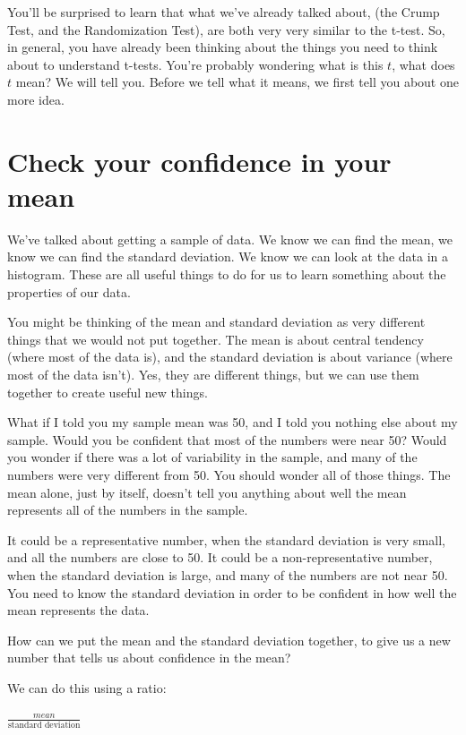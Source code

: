 \documentclass[
]{book}
\begin{document}
You'll be surprised to learn that what we've already talked about, (the Crump Test, and the Randomization Test), are both very very similar to the t-test. So, in general, you have already been thinking about the things you need to think about to understand t-tests. You're probably wondering what is this \(t\), what does \(t\) mean? We will tell you. Before we tell what it means, we first tell you about one more idea.

\section{Check your confidence in your mean}\label{check-your-confidence-in-your-mean}

We've talked about getting a sample of data. We know we can find the mean, we know we can find the standard deviation. We know we can look at the data in a histogram. These are all useful things to do for us to learn something about the properties of our data.

You might be thinking of the mean and standard deviation as very different things that we would not put together. The mean is about central tendency (where most of the data is), and the standard deviation is about variance (where most of the data isn't). Yes, they are different things, but we can use them together to create useful new things.

What if I told you my sample mean was 50, and I told you nothing else about my sample. Would you be confident that most of the numbers were near 50? Would you wonder if there was a lot of variability in the sample, and many of the numbers were very different from 50. You should wonder all of those things. The mean alone, just by itself, doesn't tell you anything about well the mean represents all of the numbers in the sample.

It could be a representative number, when the standard deviation is very small, and all the numbers are close to 50. It could be a non-representative number, when the standard deviation is large, and many of the numbers are not near 50. You need to know the standard deviation in order to be confident in how well the mean represents the data.

How can we put the mean and the standard deviation together, to give us a new number that tells us about confidence in the mean?

We can do this using a ratio:

\(\frac{mean}{\text{standard deviation}}\)
\end{document}
